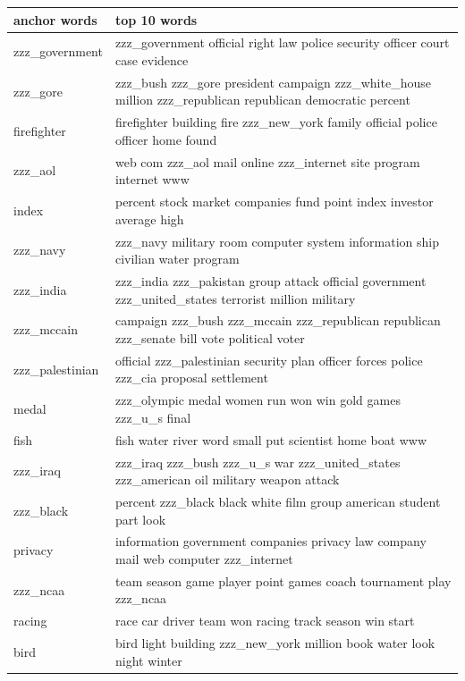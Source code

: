 \documentclass{article}
\begin{document}
\hspace{-2.5cm}
  \begin{tabular}{ l | l }
    \hline
    \bf{anchor words} & \bf{top 10 words}\\ \hline
    zzz\_government & zzz\_government official right law police security officer court case evidence \\ \hline 
    zzz\_gore & zzz\_bush zzz\_gore president campaign zzz\_white\_house million zzz\_republican republican democratic percent \\ \hline 
   firefighter & firefighter building fire zzz\_new\_york family official police officer home found \\ \hline 
    zzz\_aol & web com zzz\_aol mail online zzz\_internet site program internet www \\ \hline 
    index & percent stock market companies fund point index investor average high \\ \hline 
    zzz\_navy & zzz\_navy military room computer system information ship civilian water program \\ \hline 
    zzz\_india & zzz\_india zzz\_pakistan group attack official government zzz\_united\_states terrorist million military \\ \hline 
    zzz\_mccain & campaign zzz\_bush zzz\_mccain zzz\_republican republican zzz\_senate bill vote political voter \\ \hline 
    zzz\_palestinian & official zzz\_palestinian security plan officer forces police zzz\_cia proposal settlement \\ \hline 
    medal & zzz\_olympic medal women run won win gold games zzz\_u\_s final \\ \hline 
    fish & fish water river word small put scientist home boat www \\ \hline 
    zzz\_iraq & zzz\_iraq zzz\_bush zzz\_u\_s war zzz\_united\_states zzz\_american oil military weapon attack \\ \hline 
    zzz\_black & percent zzz\_black black white film group american student part look \\ \hline 
    privacy & information government companies privacy law company mail web computer zzz\_internet \\ \hline 
    zzz\_ncaa & team season game player point games coach tournament play zzz\_ncaa \\ \hline 
    racing & race car driver team won racing track season win start \\ \hline 
    bird & bird light building zzz\_new\_york million book water look night winter \\ \hline 

\end{tabular}
\end{document}
